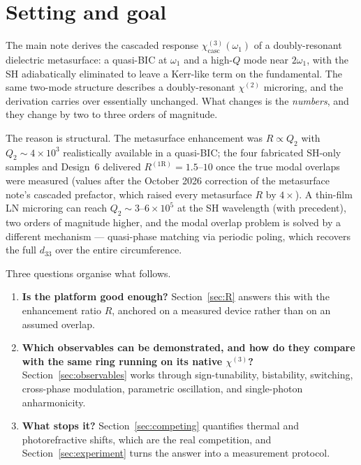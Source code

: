 \documentclass[11pt,a4paper]{article}
\newcommand{\chitwo}{\chi^{(2)}}
\newcommand{\chithree}{\chi^{(3)}}
\begin{document}
\tableofcontents

\section{Setting and goal}\label{sec:setting}

The main note derives the cascaded response
$\chithree_{\text{casc}}(\omega_1)$ of a doubly-resonant dielectric
metasurface: a quasi-BIC at $\omega_1$ and a high-$Q$ mode near
$2\omega_1$, with the SH adiabatically eliminated to leave a Kerr-like
term on the fundamental.  The same two-mode structure describes a
doubly-resonant $\chitwo$ microring, and the derivation carries over
essentially unchanged.  What changes is the \emph{numbers}, and they
change by two to three orders of magnitude.

The reason is structural.  The metasurface enhancement was
$R\propto Q_2$ with $Q_2\sim4\times10^3$ realistically available in a
quasi-BIC; the four fabricated SH-only samples and Design~6 delivered
$R^{(1\mathrm R)}=1.5$--$10$ once the true modal overlaps were measured
(values after the October 2026 correction of the metasurface note's
cascaded prefactor, which raised every metasurface $R$ by $4\times$).
A thin-film LN microring can reach $Q_2\sim3$--$6\times10^5$ at
the SH wavelength (with precedent), two orders of magnitude higher, and the modal overlap
problem is solved by a different mechanism --- quasi-phase matching via
periodic poling, which recovers the full $d_{33}$ over the entire
circumference.

Three questions organise what follows.

\begin{enumerate}[label=(\roman*),leftmargin=2em]
\item \textbf{Is the platform good enough?}  Section~\ref{sec:R}
  answers this with the enhancement ratio $R$, anchored on a measured
  device rather than on an assumed overlap.
\item \textbf{Which observables can be demonstrated, and how do they
  compare with the same ring running on its native $\chithree$?}
  Section~\ref{sec:observables} works through sign-tunability,
  bistability, switching, cross-phase modulation, parametric
  oscillation, and single-photon anharmonicity.
\item \textbf{What stops it?}  Section~\ref{sec:competing} quantifies
  thermal and photorefractive shifts, which are the real competition,
  and Section~\ref{sec:experiment} turns the answer into a measurement
  protocol.
\end{enumerate}
\end{document}
